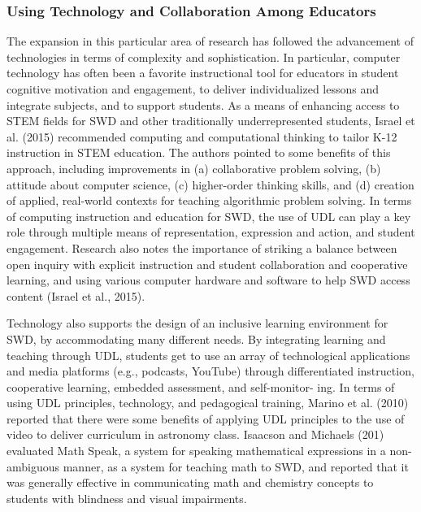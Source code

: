 \documentclass[11.5pt]{sig-alternate}
\begin{document}
\begin{large}
\subsubsection*{Using Technology and Collaboration Among Educators}
The expansion in this particular area of research has followed the advancement of technologies in terms of complexity and sophistication. In particular, computer technology has often been a favorite instructional tool for educators in student cognitive motivation and engagement, to deliver individualized lessons and integrate subjects, and to support students. As a means of enhancing access to STEM fields for SWD and other traditionally underrepresented students, Israel et al. (2015) recommended computing and computational thinking to tailor K-12 instruction in STEM education. The authors pointed to some benefits of this approach, including improvements in (a) collaborative problem solving, (b) attitude about computer science, (c) higher-order thinking skills, and (d) creation of applied, real-world contexts for teaching algorithmic problem solving. In terms of computing instruction and education for SWD, the use of UDL can play a key role through multiple means of representation, expression and action, and student engagement. Research also notes the importance of striking a balance between open inquiry with explicit instruction and student collaboration and cooperative learning, and using various computer hardware and software to help SWD access content (Israel et al., 2015). 

Technology also supports the design of an inclusive learning environment for SWD, by accommodating many different needs. By integrating learning and teaching through UDL, students get to use an array of technological applications and media platforms (e.g., podcasts, YouTube) through differentiated instruction, cooperative learning, embedded assessment, and self-monitor- ing. In terms of using UDL principles, technology, and pedagogical training, Marino et al. (2010) reported that there were some benefits of applying UDL principles to the use of video to deliver curriculum in astronomy class. Isaacson and Michaels (201) evaluated Math Speak, a system for speaking mathematical expressions in a non-ambiguous manner, as a system for teaching math to SWD, and reported that it was generally effective in communicating math and chemistry concepts to students with blindness and visual impairments. 


\end{large}
\end{document}
